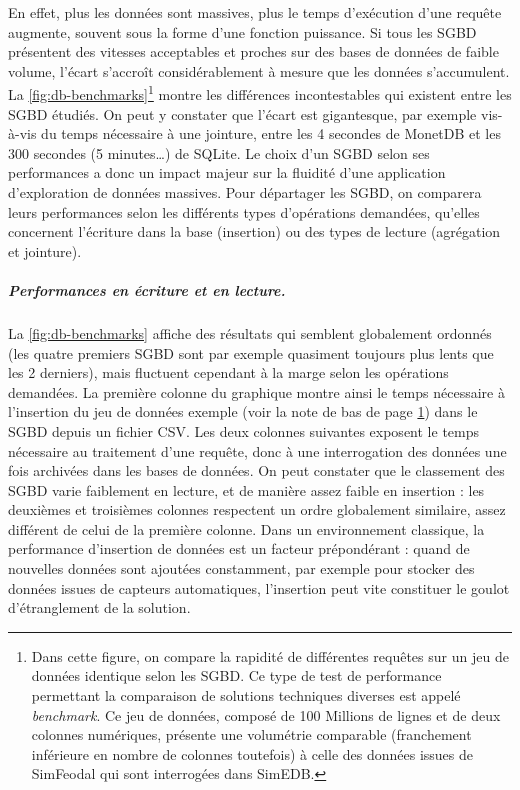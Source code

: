 En effet, plus les données sont massives, plus le temps d'exécution d'une requête augmente, souvent sous la forme d'une fonction puissance.
Si tous les SGBD présentent des vitesses acceptables et proches sur des bases de données de faible volume, l'écart s'accroît considérablement à mesure que les données s'accumulent.
La \cref{fig:db-benchmarks}\footnote{\label{ftn:dataset-exemple}
	Dans cette figure, on compare la rapidité de différentes requêtes sur un jeu de données identique selon les SGBD.
	Ce type de test de performance permettant la comparaison de solutions techniques diverses est appelé \textit{benchmark}.
	Ce jeu de données, composé de 100 Millions de lignes et de deux colonnes numériques, présente une volumétrie comparable (franchement inférieure en nombre de colonnes toutefois) à celle des données issues de SimFeodal qui sont interrogées dans SimEDB.
} montre les différences incontestables qui existent entre les SGBD étudiés. On peut y constater que l'écart est gigantesque, par exemple vis-à-vis du temps nécessaire à une jointure, entre les 4 secondes de MonetDB et les 300 secondes (5 minutes\ldots) de SQLite.
Le choix d'un SGBD selon ses performances a donc un impact majeur sur la fluidité d'une application d'exploration de données massives.
Pour départager les SGBD, on comparera leurs performances selon les différents types d'opérations demandées, qu'elles concernent l'écriture dans la base (insertion) ou des types de lecture (agrégation et jointure).

\subparagraph{Performances en écriture et en lecture.}

La \cref{fig:db-benchmarks} affiche des résultats qui semblent globalement ordonnés (les quatre premiers SGBD sont par exemple quasiment toujours plus lents que les 2 derniers), mais fluctuent cependant à la marge selon les opérations demandées.
La première colonne du graphique montre ainsi le temps nécessaire à l'insertion du jeu de données exemple (voir la note de bas de page \ref{ftn:dataset-exemple}) dans le SGBD depuis un fichier CSV.
Les deux colonnes suivantes exposent le temps nécessaire au traitement d'une requête, donc à une interrogation des données une fois archivées dans les bases de données.
On peut constater que le classement des SGBD varie faiblement en lecture, et de manière assez faible en insertion : les deuxièmes et troisièmes colonnes respectent un ordre globalement similaire, assez différent de celui de la première colonne.
Dans un environnement classique, la performance d'insertion de données est un facteur prépondérant : quand de nouvelles données sont ajoutées constamment, par exemple pour stocker des données issues de capteurs automatiques, l'insertion peut vite constituer le goulot d'étranglement de la solution.

